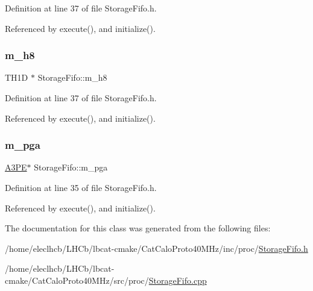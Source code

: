 Definition at line 37 of file Storage\+Fifo.\+h.



Referenced by execute(), and initialize().

\mbox{\label{classStorageFifo_aeef4b7183e14d05bab673d948d85b84c}} 
\subsubsection{\texorpdfstring{m\+\_\+h8}{m\_h8}}
{\footnotesize\ttfamily T\+H1D $\ast$ Storage\+Fifo\+::m\+\_\+h8\hspace{0.3cm}{\ttfamily [private]}}



Definition at line 37 of file Storage\+Fifo.\+h.



Referenced by execute(), and initialize().

\mbox{\label{classStorageFifo_a9e4b9d56d0cc911f124a2848d6b43981}} 
\subsubsection{\texorpdfstring{m\+\_\+pga}{m\_pga}}
{\footnotesize\ttfamily \hyperlink{classA3PE}{A3\+PE}$\ast$ Storage\+Fifo\+::m\+\_\+pga\hspace{0.3cm}{\ttfamily [private]}}



Definition at line 35 of file Storage\+Fifo.\+h.



Referenced by execute(), and initialize().



The documentation for this class was generated from the following files\+:\begin{DoxyCompactItemize}
\item 
/home/eleclhcb/\+L\+H\+Cb/lbcat-\/cmake/\+Cat\+Calo\+Proto40\+M\+Hz/inc/proc/\hyperlink{StorageFifo_8h}{Storage\+Fifo.\+h}\item 
/home/eleclhcb/\+L\+H\+Cb/lbcat-\/cmake/\+Cat\+Calo\+Proto40\+M\+Hz/src/proc/\hyperlink{StorageFifo_8cpp}{Storage\+Fifo.\+cpp}\end{DoxyCompactItemize}
